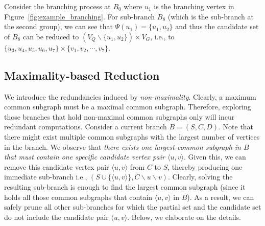 \noindent{}

\begin{example}
    Consider the branching process at $B_0$ where $u_1$ is the branching vertex in Figure~\ref{fig:example_branching}. For sub-branch $B_8$ (which is the sub-branch at the second group), we can see that $\Psi(u_1)=\{u_1,u_2\}$ and thus the candidate set of $B_8$ can be reduced to $ (V_Q\backslash\{u_1,u_2\})\times V_G$, {\YuiR i.e., to $\{u_3,u_4,u_5,u_6,u_7\}\times \{v_1,v_2,\cdots,v_7\}$}.
\end{example}


\subsection{Maximality-based Reduction}
\label{subsec:maximality-reduction}

We introduce the redundancies induced by \emph{non-maximality}. Clearly, a maximum common subgraph must be a maximal common subgraph. Therefore, exploring those branches that hold non-maximal common subgraphs only will incur redundant computations. 
%
Consider a current branch $B=(S,C,D)$. {\chengC Note that there might exist multiple common subgraphs with the largest number of vertices in the branch.}
%
We observe that \emph{there exists one largest common subgraph in $B$ that must contain one specific candidate vertex pair $\langle u,v \rangle$}. 
%
{\YuiR Given this, we can remove this candidate vertex pair $\langle u,v\rangle$ from $C$ to $S$, thereby producing one immediate sub-branch i.e., $(S\cup\{\langle u,v \rangle\},C\backslash u\backslash v)$. Clearly, solving the resulting sub-branch is enough to find the largest common subgraph (since it holds all those common subgraphs that contain $\langle u,v\rangle$ in $B$). As a result,  we can safely prune all other sub-branches for which the partial set and the candidate set do not include the candidate pair $\langle u,v\rangle$.}
%
%
Below, we elaborate on the details.


